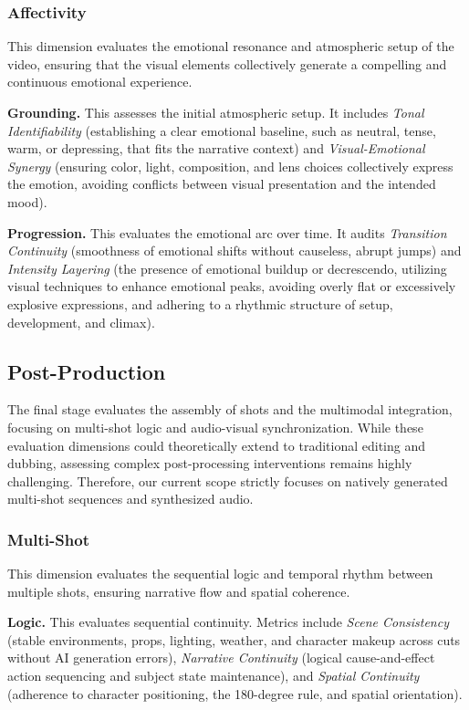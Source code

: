 \documentclass{llmxive}
\begin{document}
\subsubsection{Affectivity}
\noindent
This dimension evaluates the emotional resonance and atmospheric setup of the video, ensuring that the visual elements collectively generate a compelling and continuous emotional experience.

\noindent
\textbf{Grounding.} This assesses the initial atmospheric setup. It includes \textit{Tonal Identifiability} (establishing a clear emotional baseline, such as neutral, tense, warm, or depressing, that fits the narrative context) and \textit{Visual-Emotional Synergy} (ensuring color, light, composition, and lens choices collectively express the emotion, avoiding conflicts between visual presentation and the intended mood).

\noindent
\textbf{Progression.} This evaluates the emotional arc over time. It audits \textit{Transition Continuity} (smoothness of emotional shifts without causeless, abrupt jumps) and \textit{Intensity Layering} (the presence of emotional buildup or decrescendo, utilizing visual techniques to enhance emotional peaks, avoiding overly flat or excessively explosive expressions, and adhering to a rhythmic structure of setup, development, and climax).

\subsection{Post-Production}
The final stage evaluates the assembly of shots and the multimodal integration, focusing on multi-shot logic and audio-visual synchronization. While these evaluation dimensions could theoretically extend to traditional editing and dubbing, assessing complex post-processing interventions remains highly challenging. Therefore, our current scope strictly focuses on natively generated multi-shot sequences and synthesized audio.

\subsubsection{Multi-Shot}
\noindent
This dimension evaluates the sequential logic and temporal rhythm between multiple shots, ensuring narrative flow and spatial coherence.

\noindent
\textbf{Logic.} This evaluates sequential continuity. Metrics include \textit{Scene Consistency} (stable environments, props, lighting, weather, and character makeup across cuts without AI generation errors), \textit{Narrative Continuity} (logical cause-and-effect action sequencing and subject state maintenance), and \textit{Spatial Continuity} (adherence to character positioning, the 180-degree rule, and spatial orientation).
\end{document}
